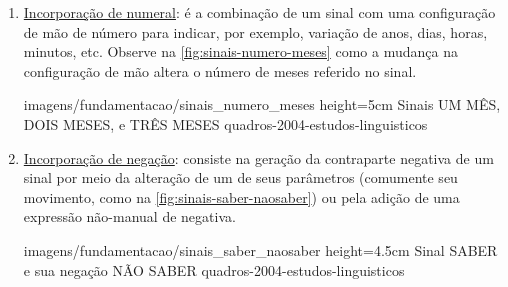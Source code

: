 \begin{enumerate}
\begin{enumerate}
        

        \item \underline{Incorporação de numeral}: é a combinação de um sinal com uma configuração de mão de número para indicar, por exemplo, variação de anos, dias, horas, minutos, etc. Observe na \autoref{fig:sinais-numero-meses} como a mudança na configuração de mão altera o número de meses referido no sinal.
        
        
            {imagens/fundamentacao/sinais_numero_meses} %
            {height=5cm} %
            {Sinais UM MÊS, DOIS MESES, e TRÊS MESES} %
            {quadros-2004-estudos-linguisticos} %



        \item \underline{Incorporação de negação}: consiste na geração da contraparte negativa de um sinal por meio da alteração de um de seus parâmetros (comumente seu movimento, como na \autoref{fig:sinais-saber-naosaber}) ou pela adição de uma expressão não-manual de negativa.
        
        
            {imagens/fundamentacao/sinais_saber_naosaber} %
            {height=4.5cm} %
            {Sinal SABER e sua negação NÃO SABER} %
            {quadros-2004-estudos-linguisticos} %




\end{enumerate}
\end{enumerate}
